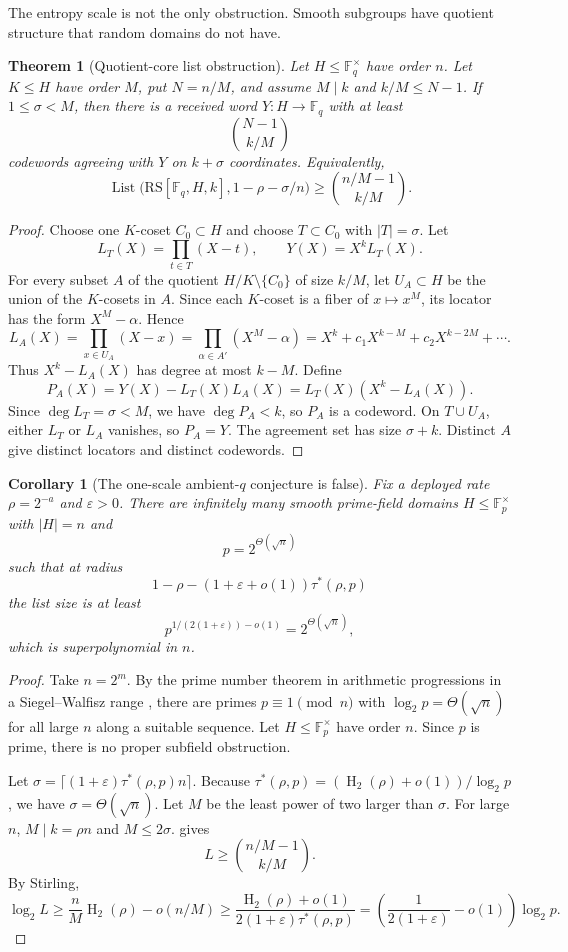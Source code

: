 \documentclass[11pt]{article}
\newtheorem{theorem}{Theorem}[section]
\newtheorem{corollary}[corollary]{Corollary}
\theoremstyle{definition}
\newcommand{\F}{\mathbb F}
\newcommand{\eps}{\varepsilon}
\newcommand{\HH}{\operatorname{H}_2}
\newcommand{\RS}{\mathrm{RS}}
\newcommand{\Lst}{\operatorname{List}}
\newcommand{\taustar}{\tau^{*}}
\begin{document}
The entropy scale is not the only obstruction.  Smooth subgroups have quotient structure that random domains do not have.

\begin{theorem}[Quotient-core list obstruction]\label{thm:qcore}
Let $H\le\F_q^\times$ have order $n$.  Let $K\le H$ have order $M$, put $N=n/M$, and assume $M\mid k$ and $k/M\le N-1$.  If $1\le\sigma<M$, then there is a received word $Y:H\to\F_q$ with at least
\[
        \binom{N-1}{k/M}
\]
codewords agreeing with $Y$ on $k+\sigma$ coordinates.  Equivalently,
\[
        \Lst\big(\RS[\F_q,H,k],1-\rho-\sigma/n\big)\ge \binom{n/M-1}{k/M}.
\]
\end{theorem}

\begin{proof}
Choose one $K$-coset $C_0\subset H$ and choose $T\subset C_0$ with $|T|=\sigma$.  Let
\[
        L_T(X)=\prod_{t\in T}(X-t),\qquad Y(X)=X^kL_T(X).
\]
For every subset $A$ of the quotient $H/K\setminus\{C_0\}$ of size $k/M$, let $U_A\subset H$ be the union of the $K$-cosets in $A$.  Since each $K$-coset is a fiber of $x\mapsto x^M$, its locator has the form $X^M-\alpha$.  Hence
\[
        L_A(X)=\prod_{x\in U_A}(X-x)=\prod_{\alpha\in A'}(X^M-\alpha)
        =X^k+c_1X^{k-M}+c_2X^{k-2M}+\cdots .
\]
Thus $X^k-L_A(X)$ has degree at most $k-M$.  Define
\[
        P_A(X)=Y(X)-L_T(X)L_A(X)=L_T(X)(X^k-L_A(X)).
\]
Since $\deg L_T=\sigma<M$, we have $\deg P_A<k$, so $P_A$ is a codeword.  On $T\cup U_A$, either $L_T$ or $L_A$ vanishes, so $P_A=Y$.  The agreement set has size $\sigma+k$.  Distinct $A$ give distinct locators and distinct codewords.
\end{proof}

\begin{corollary}[The one-scale ambient-$q$ conjecture is false]\label{cor:one-scale-false}
Fix a deployed rate $\rho=2^{-a}$ and $\eps>0$.  There are infinitely many smooth prime-field domains $H\le\F_p^\times$ with $|H|=n$ and
\[
        p=2^{\Theta(\sqrt n)}
\]
such that at radius
\[
        1-\rho-(1+\eps+o(1))\taustar(\rho,p)
\]
the list size is at least
\[
        p^{1/(2(1+\eps))-o(1)}=2^{\Theta(\sqrt n)},
\]
which is superpolynomial in $n$.
\end{corollary}

\begin{proof}
Take $n=2^m$.  By the prime number theorem in arithmetic progressions in a Siegel--Walfisz range \cite{Dav00}, there are primes $p\equiv1\pmod n$ with $\log_2p=\Theta(\sqrt n)$ for all large $n$ along a suitable sequence.  Let $H\le\F_p^\times$ have order $n$.  Since $p$ is prime, there is no proper subfield obstruction.

Let $\sigma=\lceil(1+\eps)\taustar(\rho,p)n\rceil$.  Because $\taustar(\rho,p)=(\HH(\rho)+o(1))/\log_2p$, we have $\sigma=\Theta(\sqrt n)$.  Let $M$ be the least power of two larger than $\sigma$.  For large $n$, $M\mid k=\rho n$ and $M\le2\sigma$.   gives
\[
        L\ge \binom{n/M-1}{k/M}.
\]
By Stirling,
\[
        \log_2 L\ge \frac{n}{M}\HH(\rho)-o(n/M)
        \ge \frac{\HH(\rho)+o(1)}{2(1+\eps)\taustar(\rho,p)}
        =\left(\frac1{2(1+\eps)}-o(1)\right)\log_2p .
\]
\end{proof}
\end{document}

